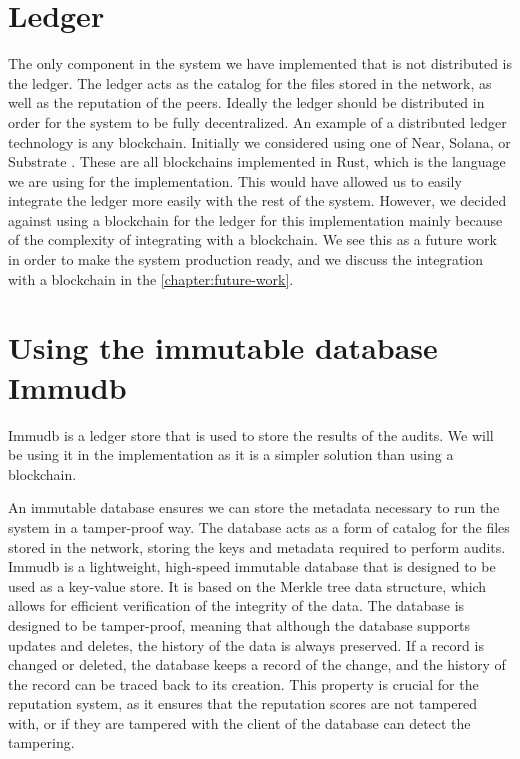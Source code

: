 \section{Ledger}

The only component in the system we have implemented that is not distributed is the ledger.
The ledger acts as the catalog for the files stored in the network,
as well as the reputation of the peers.
Ideally the ledger should be distributed in order for the system to be fully decentralized.
An example of a distributed ledger technology is any blockchain.
Initially we considered using one of Near, Solana, or Substrate \cite{near, solana, substrate}.
These are all blockchains implemented in Rust, which is the language we are using for the implementation.
This would have allowed us to easily integrate the ledger more easily with the rest of the system.
However, we decided against using a blockchain for the ledger for this implementation
mainly because of the complexity of integrating with a blockchain.
We see this as a future work in order to make the system production ready,
and we discuss the integration with a blockchain in the \autoref{chapter:future-work}.

\section{Using the immutable database Immudb}

Immudb \cite{immudb} is a ledger store that is used to store the results of the audits.
We will be using it in the implementation as it is a simpler solution than using a blockchain.

An immutable database ensures we can store the metadata necessary to run the system
in a tamper-proof way.
The database acts as a form of catalog for the files stored in the network,
storing the keys and metadata required to perform audits.
Immudb is a lightweight, high-speed immutable database that is designed to be used as a key-value store.
It is based on the Merkle tree data structure, which allows for efficient verification of the integrity of the data.
The database is designed to be tamper-proof, meaning that although the database supports updates and deletes,
the history of the data is always preserved.
If a record is changed or deleted,
the database keeps a record of the change, and the history of the record can be traced back to its creation.
This property is crucial for the reputation system, as it ensures that the reputation scores are not tampered with,
or if they are tampered with the client of the database can detect the tampering.

